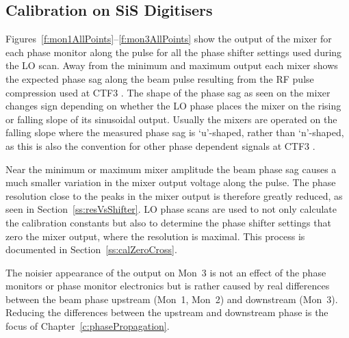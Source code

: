 \subsection{Calibration on SiS Digitisers}
\label{ss:SiSCal}

Figures~\ref{f:mon1AllPoints}--\ref{f:mon3AllPoints} show the output of the mixer for each phase monitor along the pulse for all the phase shifter settings used during the LO scan. Away from the minimum and maximum output each mixer shows the expected phase sag along the beam pulse resulting from the RF pulse compression used at CTF3 \cite{rfCompress}. The shape of the phase sag as seen on the mixer changes sign depending on whether the LO phase places the mixer on the rising or falling slope of its sinusoidal output. Usually the mixers are operated on the falling slope where the measured phase sag is `u'-shaped, rather than `n'-shaped, as this is also the convention for other phase dependent signals at CTF3 \cite{piotrPriv}.

Near the minimum or maximum mixer amplitude the beam phase sag causes a much smaller variation in the mixer output voltage along the pulse. The phase resolution close to the peaks in the mixer output is therefore greatly reduced, as seen in Section~\ref{ss:resVsShifter}. LO phase scans are used to not only calculate the calibration constants but also to determine the phase shifter settings that zero the mixer output, where the resolution is maximal. This process is documented in Section~\ref{ss:calZeroCross}.

The noisier appearance of the output on Mon~3 is not an effect of the phase monitors or phase monitor electronics but is rather caused by real differences between the beam phase upstream (Mon~1, Mon~2) and downstream (Mon~3). Reducing the differences between the upstream and downstream phase is the focus of Chapter~\ref{c:phasePropagation}.

